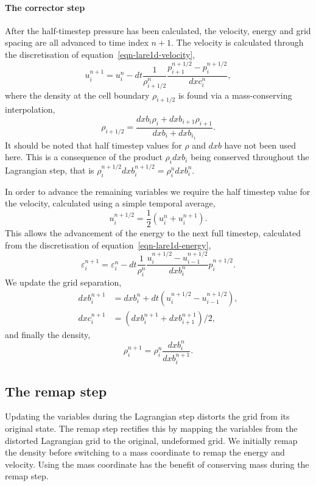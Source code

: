 \paragraph{The corrector step}
\label{sec-corrector-step}
After the half-timestep pressure has been calculated, the velocity, energy and grid spacing are all advanced to time index $n+1$. The velocity is calculated through the discretisation of equation~\eqref{eqn-lare1d-velocity},
\begin{equation}
  u_i^{n+1} = u_i^n - dt \frac{1}{\rho^n_{i+1/2}}\frac{p^{n+1/2}_{i+1} - p^{n+1/2}_i}{dxc_i^n},
  \label{}
\end{equation}
where the density at the cell boundary $\rho_{i+1/2}$ is found via a mass-conserving interpolation,
\begin{equation}
  \rho_{i+1/2} = \frac{dxb_i \rho_i + dxb_{i+1}\rho_{i+1}}{dxb_i + dxb_{i_1}}.
  \label{eqn-lagrangian-density-interpolation}
\end{equation}
It should be noted that half timestep values for $\rho$ and $dxb$ have not been used here. This is a consequence of the product $\rho_i dxb_i$ being conserved throughout the Lagrangian step, that is $\rho_i^{n+1/2} dxb_i^{n+1/2} = \rho_i^n dxb_i^n$.

In order to advance the remaining variables we require the half timestep value for the velocity, calculated using a simple temporal average,
\begin{equation}
  u_i^{n+1/2} = \frac{1}{2}(u_i^{n} + u_i^{n+1}).
  \label{}
\end{equation}
This allows the advancement of the energy to the next full timestep, calculated from the discretisation of equation~\eqref{eqn-lare1d-energy},
\begin{equation}
  \varepsilon_i^{n+1} = \varepsilon_i^{n} - dt \frac{1}{\rho_i^n} \frac{u_i^{n+1/2} - u_{i-1}^{n+1/2}}{ dxb_i^n}p_i^{n+1/2}.
  \label{}
\end{equation}
We update the grid separation,
\begin{align}
  dxb_i^{n+1} &=  dxb_i^n + dt(u_i^{n+1/2} - u_{i-1}^{n+1/2}),\\
  dxc_i^{n+1} &=  (dxb_i^{n+1} + dxb_{i+1}^{n+1})/2,
  \label{eqn-lagrangian-grid-update}
\end{align}
and finally the density,
\begin{equation}
  \rho_i^{n+1} = \rho_i^n \frac{dxb_i^n}{dxb_i^{n+1}}.
  \label{}
\end{equation}

\subsection{The remap step}
Updating the variables during the Lagrangian step distorts the grid from its original state. The remap step rectifies this by mapping the variables from the distorted Lagrangian grid to the original, undeformed grid. We initially remap the density before switching to a mass coordinate to remap the energy and velocity. Using the mass coordinate has the benefit of conserving mass during the remap step.


